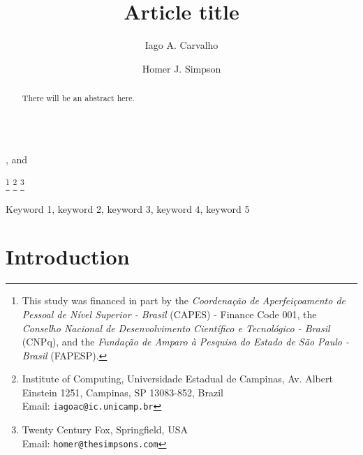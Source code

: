 \documentclass{endm}
\begin{document}
\begin{verbatim}\end{verbatim}\vspace{2.5cm}

\begin{frontmatter}

\title{Article title}

\author{Iago A. Carvalho}, and
\author{Homer J. Simpson}

\thanks[all]{This study was financed in part by the \emph{Coordenação de Aperfeiçoamento de Pessoal de Nível Superior - Brasil} (CAPES) - Finance Code 001, the \emph{Conselho Nacional de Desenvolvimento Científico e Tecnológico - Brasil} (CNPq), and the \emph{Fundação de Amparo à Pesquisa do Estado de São Paulo - Brasil} (FAPESP).}
\thanks[unicamp]{Institute of Computing, Universidade Estadual de Campinas, Av. Albert Einstein 1251, Campinas, SP 13083-852, Brazil \\Email: \texttt{\normalshape iagoac@ic.unicamp.br}}
\thanks[fox]{Twenty Century Fox, Springfield, USA \\ Email:
\texttt{\normalshape homer@thesimpsons.com}}

\begin{abstract}
There will be an abstract here.
\end{abstract}

\begin{keyword}
Keyword 1, keyword 2, keyword 3, keyword 4, keyword 5
\end{keyword}

\end{frontmatter}

\section{Introduction}\label{sec:intro}



\end{document}
